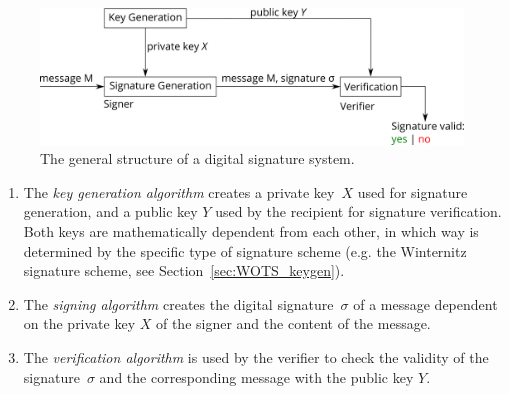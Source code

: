 \begin{figure}
\centering
\includegraphics[width=\linewidth]{images/Background/Digital_Signaturesystem_Simple.png}
\caption{The general structure of a digital signature system. %
}
\label{img:digital_sign_system_simple}
\end{figure} 

\begin{enumerate}
\item The \textit{key generation algorithm} creates a private key~$X$ used for signature generation, and a public key $Y$ used by the recipient for signature verification. Both keys are mathematically dependent from each other, in which way is determined by the specific type of signature scheme (e.g. the Winternitz signature scheme, see Section~\ref{sec:WOTS_keygen}). %
\item The \textit{signing algorithm} creates the digital signature~$\sigma$ of a message dependent on the private key $X$ of the signer and the content of the message.
\item The \textit{verification algorithm} is used by the verifier to check the validity of the signature~$\sigma$ and the corresponding message with the public key $Y$.
\end{enumerate}

